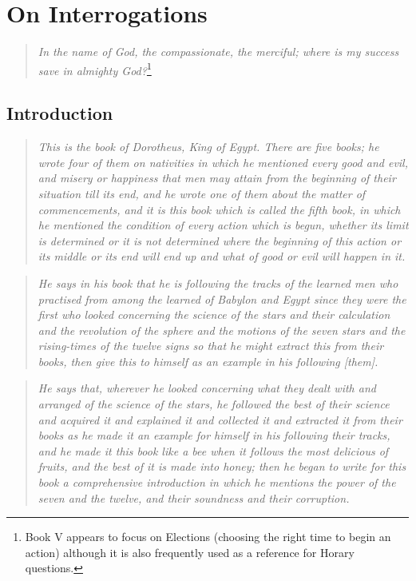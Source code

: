 \chapter{On Interrogations}
\begin{quote}
\textsl{In the name of God, the compassionate, the merciful; where is my success save in almighty God?}\footnote{Book V appears to focus on Elections (choosing the right time to begin an action) although it is also frequently used as a reference for Horary questions.}
\end{quote}
\section{Introduction}
\begin{quote}
\textsl{This is the book of Dorotheus, King of Egypt. There are five books; he wrote four of them on nativities in which he mentioned every good and evil, and misery or happiness that men may attain from the beginning of their situation till its end, and he wrote one of them about the matter of commencements, and it is this book which is called the fifth book, in which he mentioned the condition of every action which is begun, whether its limit is determined or it is not determined where the beginning of this action or its middle or its end will end up and what of good or evil will happen in it.}
\end{quote}
\begin{quote}
\textsl{He says in his book that he is following the tracks of the learned men who practised from among the learned of Babylon and Egypt since they were the first who looked concerning the science of the stars and their calculation and the revolution of the sphere and the motions of the seven stars and the rising-times of the twelve signs so that he might extract this from their books, then give this to himself as an example in his following [them].}
\end{quote}
\begin{quote}
\textsl{He says that, wherever he looked concerning what they dealt with and arranged of the science of the stars, he followed the best of their science and acquired it and explained it and collected it and extracted it from their books as he made it an example for himself in his following their tracks, and he made it this book like a bee when it follows the most delicious of fruits, and the best of it is made into honey; then he began to write for this book a comprehensive introduction in which he mentions the power of the seven and the twelve, and their soundness and their corruption.}
\end{quote}
